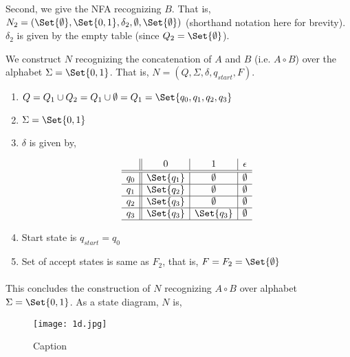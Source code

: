 \documentclass{article}
\begin{document}
Second, we give the NFA recognizing $B$.  That is, $N_2 = (\Set{\emptyset}, \Set{0,1}, \delta_2, \emptyset, \Set{\emptyset})$ (shorthand notation here for brevity).  $\delta_2$ is given by the empty table (since $Q_2 = \Set{\emptyset}$).

We construct $N$ recognizing the concatenation of $A$ and $B$ (i.e. $A \circ B$) over the alphabet $\Sigma = \Set{0,1}$.  That is, $N = (Q, \Sigma, \delta, q_{start}, F)$.

\begin{enumerate}
    \item $Q = Q_1 \cup Q_2 = Q_1 \cup \emptyset = Q_1 = \Set{q_0, q_1, q_2, q_3}$
    \item $\Sigma = \Set{0,1}$
    \item $\delta$ is given by,
    
\begin{figure}[H]
\centering

\[
\begin{array}{c||c|c|c}
         & 0 & 1 & \epsilon \\ \hline \hline 
        q_0 & \Set{q_1} & \emptyset & \emptyset \\ \hline 
        q_1 & \Set{q_2} & \emptyset & \emptyset \\ \hline 
        q_2 & \Set{q_3} & \emptyset & \emptyset \\ \hline 
        q_3 & \Set{q_3} & \Set{q_3} & \emptyset \\ \hline 
\end{array}
\]

\caption{}
\label{fig:mylabel}
\end{figure}

    
    \item Start state is $q_{start} = q_0$
    \item Set of accept states is same as $F_2$, that is, $F = F_2 = \Set{\emptyset}$
\end{enumerate}

\paragraph{}

This concludes the construction of $N$ recognizing $A \circ B$ over alphabet $\Sigma = \Set{0,1}$.  As a state diagram, $N$ is,

\begin{figure}[H]
    \centering
    \texttt{[image: 1d.jpg]}
    \caption{Caption}
    \label{fig:my_label}
\end{figure}
\end{document}
